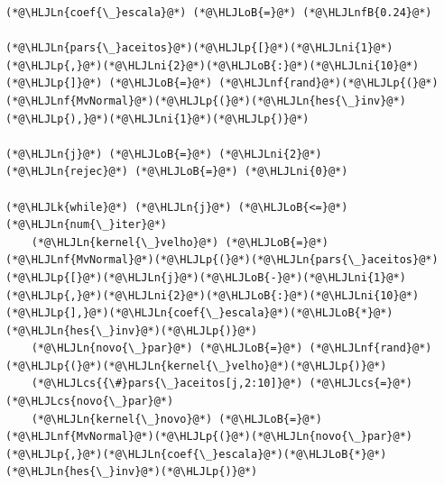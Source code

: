 \documentclass[12pt,a4paper]{article}
\newcommand{\HLJLk}[1]{\textcolor[RGB]{148,91,176}{\textbf{#1}}}
\newcommand{\HLJLn}[1]{#1}
\newcommand{\HLJLnf}[1]{\textcolor[RGB]{66,102,213}{#1}}
\newcommand{\HLJLnfB}[1]{\textcolor[RGB]{59,151,46}{#1}}
\newcommand{\HLJLni}[1]{\textcolor[RGB]{59,151,46}{#1}}
\newcommand{\HLJLoB}[1]{\textcolor[RGB]{102,102,102}{\textbf{#1}}}
\newcommand{\HLJLp}[1]{#1}
\newcommand{\HLJLcs}[1]{\textcolor[RGB]{153,153,119}{\textit{#1}}}
\begin{document}
\begin{lstlisting}
(*@\HLJLn{coef{\_}escala}@*) (*@\HLJLoB{=}@*) (*@\HLJLnfB{0.24}@*)

(*@\HLJLn{pars{\_}aceitos}@*)(*@\HLJLp{[}@*)(*@\HLJLni{1}@*)(*@\HLJLp{,}@*)(*@\HLJLni{2}@*)(*@\HLJLoB{:}@*)(*@\HLJLni{10}@*)(*@\HLJLp{]}@*) (*@\HLJLoB{=}@*) (*@\HLJLnf{rand}@*)(*@\HLJLp{(}@*)(*@\HLJLnf{MvNormal}@*)(*@\HLJLp{(}@*)(*@\HLJLn{hes{\_}inv}@*)(*@\HLJLp{),}@*)(*@\HLJLni{1}@*)(*@\HLJLp{)}@*)

(*@\HLJLn{j}@*) (*@\HLJLoB{=}@*) (*@\HLJLni{2}@*)
(*@\HLJLn{rejec}@*) (*@\HLJLoB{=}@*) (*@\HLJLni{0}@*)

(*@\HLJLk{while}@*) (*@\HLJLn{j}@*) (*@\HLJLoB{<=}@*) (*@\HLJLn{num{\_}iter}@*)
    (*@\HLJLn{kernel{\_}velho}@*) (*@\HLJLoB{=}@*) (*@\HLJLnf{MvNormal}@*)(*@\HLJLp{(}@*)(*@\HLJLn{pars{\_}aceitos}@*)(*@\HLJLp{[}@*)(*@\HLJLn{j}@*)(*@\HLJLoB{-}@*)(*@\HLJLni{1}@*)(*@\HLJLp{,}@*)(*@\HLJLni{2}@*)(*@\HLJLoB{:}@*)(*@\HLJLni{10}@*)(*@\HLJLp{],}@*)(*@\HLJLn{coef{\_}escala}@*)(*@\HLJLoB{*}@*)(*@\HLJLn{hes{\_}inv}@*)(*@\HLJLp{)}@*)
    (*@\HLJLn{novo{\_}par}@*) (*@\HLJLoB{=}@*) (*@\HLJLnf{rand}@*)(*@\HLJLp{(}@*)(*@\HLJLn{kernel{\_}velho}@*)(*@\HLJLp{)}@*)
    (*@\HLJLcs{{\#}pars{\_}aceitos[j,2:10]}@*) (*@\HLJLcs{=}@*) (*@\HLJLcs{novo{\_}par}@*)
    (*@\HLJLn{kernel{\_}novo}@*) (*@\HLJLoB{=}@*) (*@\HLJLnf{MvNormal}@*)(*@\HLJLp{(}@*)(*@\HLJLn{novo{\_}par}@*)(*@\HLJLp{,}@*)(*@\HLJLn{coef{\_}escala}@*)(*@\HLJLoB{*}@*)(*@\HLJLn{hes{\_}inv}@*)(*@\HLJLp{)}@*)


\end{lstlisting}
\end{document}
